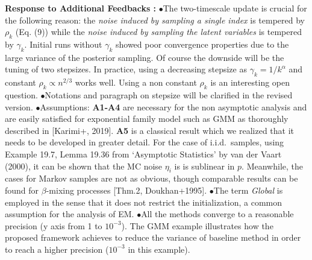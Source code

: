 \documentclass{article}
\begin{document}
\textbf{Response to Additional Feedbacks :}
$\bullet$The two-timescale update is crucial for the following reason: the \emph{noise induced by sampling a single index} is tempered by $\rho_k$ (Eq. (9)) while the \emph{noise induced by sampling the latent variables} is tempered by $\gamma_k$. 
Initial runs without $\gamma_k$ showed poor convergence properties due to the large variance of the posterior sampling.
Of course the downside will be the tuning of two stepsizes. 
In practice, using a decreasing stepsize as $\gamma_k = 1/k^{\alpha}$ and constant $\rho_k \propto n^{2/3}$ works well.
Using a non constant $\rho_k$ is an interesting open question.
$\bullet$Notations and paragraph on stepsize will be clarified in the revised version.
$\bullet$Assumptions: \textbf{A1-A4} are necessary for the non asymptotic analysis and are easily satisfied for exponential family model such as GMM as thoroughly described in [Karimi+, 2019].
\textbf{A5} is a classical result which we realized that it needs to be developed in greater detail. For the case of i.i.d.~samples, using Example 19.7, Lemma 19.36 from `Asymptotic Statistics' by van der Vaart (2000), it can be shown that the MC noise $\eta_i$ is is sublinear in $p$. Meanwhile, the cases for Markov samples are not as obvious, though comparable results can be found for $\beta$-mixing processes [Thm.2, Doukhan+1995]. 
$\bullet$The term \emph{Global} is employed in the sense that it does not restrict the initialization, a common assumption for the analysis of EM.
$\bullet$All the methods converge to a reasonable precision (y axis from 1 to $10^{-3}$).
The GMM example illustrates how the proposed framework achieves to reduce the variance of baseline method in order to reach a higher precision ($10^{-3}$ in this example).
\end{document}
